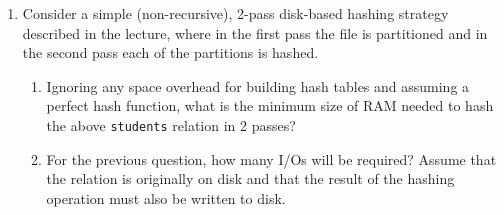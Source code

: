 \documentclass[12pt]{article}
\begin{document}
\begin{enumerate}
    \item Consider a simple (non-recursive), 2-pass disk-based hashing
      strategy described in the lecture, where in the first pass the
      file is partitioned and in the second pass each of the
      partitions is hashed.
      \begin{enumerate}[label=(\roman*)]
      \item Ignoring any space overhead for building hash tables and
        assuming a perfect hash function, what is the minimum size of
        RAM needed to hash the above \texttt{students} relation in 2
        passes?
      \item For the previous question, how many I/Os will be required?
        Assume that the relation is originally on disk and that the
        result of the hashing operation must also be written to disk.
      \end{enumerate}
\end{enumerate}      
\end{document}
